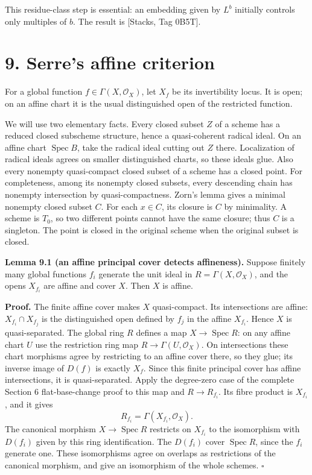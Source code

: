 \documentclass[11pt,a4paper,openany]{report}
\newcounter{none}
\begin{document}
This residue-class step is essential: an embedding given by \(L^b\) initially controls only multiples of \(b\). The result is {[}Stacks, Tag 0B5T{]}.

\section{9. Serre's affine criterion}\label{AG-RG-S01-serres-affine-criterion}

For a global function \(f\in\Gamma(X,\mathcal O_X)\), let \(X_f\) be its invertibility locus. It is open; on an affine chart it is the usual distinguished open of the restricted function.

We will use two elementary facts. Every closed subset \(Z\) of a scheme has a reduced closed subscheme structure, hence a quasi-coherent radical ideal. On an affine chart \(\operatorname{Spec}B\), take the radical ideal cutting out \(Z\) there. Localization of radical ideals agrees on smaller distinguished charts, so these ideals glue. Also every nonempty quasi-compact closed subset of a scheme has a closed point. For completeness, among its nonempty closed subsets, every descending chain has nonempty intersection by quasi-compactness. Zorn's lemma gives a minimal nonempty closed subset \(C\). For each \(x\in C\), its closure is \(C\) by minimality. A scheme is \(T_0\), so two different points cannot have the same closure; thus \(C\) is a singleton. The point is closed in the original scheme when the original subset is closed.

\textbf{Lemma 9.1 (an affine principal cover detects affineness).} Suppose finitely many global functions \(f_i\) generate the unit ideal in \(R=\Gamma(X,\mathcal O_X)\), and the opens \(X_{f_i}\) are affine and cover \(X\). Then \(X\) is affine.

\textbf{Proof.} The finite affine cover makes \(X\) quasi-compact. Its intersections are affine: \(X_{f_i}\cap X_{f_j}\) is the distinguished open defined by \(f_j\) in the affine \(X_{f_i}\). Hence \(X\) is quasi-separated. The global ring \(R\) defines a map \(X\to\operatorname{Spec}R\): on any affine chart \(U\) use the restriction ring map \(R\to\Gamma(U,\mathcal O_X)\). On intersections these chart morphisms agree by restricting to an affine cover there, so they glue; its inverse image of \(D(f)\) is exactly \(X_f\). Since this finite principal cover has affine intersections, it is quasi-separated. Apply the degree-zero case of the complete Section 6 flat-base-change proof to this map and \(R\to R_{f_i}\). Its fibre product is \(X_{f_i}\), and it gives \[
R_{f_i}=\Gamma(X_{f_i},\mathcal O_X).
\] The canonical morphism \(X\to\operatorname{Spec}R\) restricts on \(X_{f_i}\) to the isomorphism with \(D(f_i)\) given by this ring identification. The \(D(f_i)\) cover \(\operatorname{Spec}R\), since the \(f_i\) generate one. These isomorphisms agree on overlaps as restrictions of the canonical morphism, and give an isomorphism of the whole schemes. \(\square\)
\end{document}

